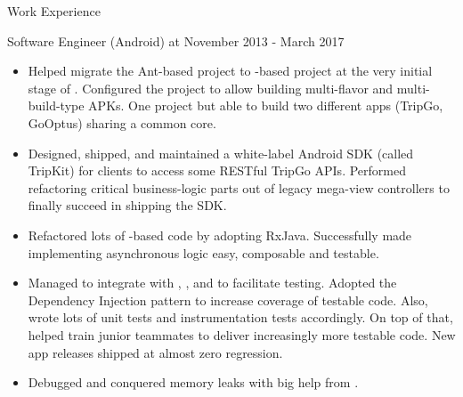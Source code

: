 \documentclass[]{SAMPLE_mcdowellcv}
\begin{document}
      \begin{cvsection}
        {Work Experience}
        \begin{cvsubsection}
          {Software Engineer (Android) at }
          {November 2013 - March 2017}
          \begin{itemize}
            \item Helped migrate the Ant-based project to -based project at the very initial stage of . Configured the project to allow building multi-flavor and multi-build-type APKs. One project but able to build two different apps (TripGo, GoOptus) sharing a common core.
            \item Designed, shipped, and maintained a white-label Android SDK (called TripKit) for clients to access some RESTful
    TripGo APIs. Performed refactoring critical business-logic parts out of legacy mega-view controllers to finally succeed in shipping the SDK.
            \item Refactored lots of -based code by adopting RxJava. Successfully made implementing asynchronous logic
    easy, composable and testable.
            \item Managed to integrate with , ,  and  to facilitate testing. Adopted the Dependency Injection pattern to increase coverage of testable code. Also, wrote lots of unit tests and instrumentation tests accordingly. On top of that, helped train junior teammates to deliver increasingly more testable code. New app releases shipped at almost zero regression.
            \item Debugged and conquered memory leaks with big help from .
          \end{itemize}
        \end{cvsubsection}


\end{cvsection}
\end{document}
